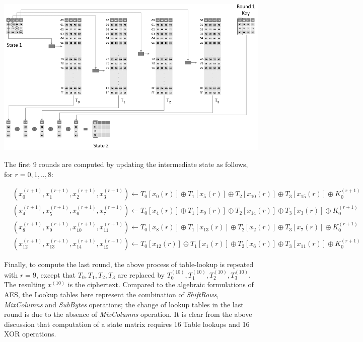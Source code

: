 \begin{center}
\includegraphics[scale=0.5,natwidth=916,natheight=528]{Figures/aes-1-1.png}
\label{fig: The diagram shows how $x_0^1,x_1^1,x_2^1,x_3^1$ are computed.}
\end{center}

\begin{flushleft}
The first 9 rounds are computed by updating the intermediate state as follows, for $r=0,1,..,8$:
\end{flushleft}
\begin{small}
\begin{align*}
&(x_0^{(r+1)},x_1^{(r+1)},x_2^{(r+1)},x_3^{(r+1)}) \gets T_0[x_0{(r)}] \oplus T_1[x_5{(r)}] \oplus T_2[x_{10}{(r)}] \oplus T_3[x_{15}{(r)}] \oplus K_0^{(r+1)}\\
&(x_4^{(r+1)},x_5^{(r+1)},x_6^{(r+1)},x_7^{(r+1)}) \gets T_0[x_4{(r)}] \oplus T_1[x_9{(r)}] \oplus T_2[x_{14}{(r)}] \oplus T_3[x_{3}{(r)}] \oplus K_0^{(r+1)}\\
&(x_8^{(r+1)},x_9^{(r+1)},x_{10}^{(r+1)},x_{11}^{(r+1)}) \gets T_0[x_8{(r)}] \oplus T_1[x_{13}{(r)}] \oplus T_2[x_{2}{(r)}] \oplus T_3[x_{7}{(r)}] \oplus K_0^{(r+1)}\\
&(x_{12}^{(r+1)},x_{13}^{(r+1)},x_{14}^{(r+1)},x_{15}^{(r+1)}) \gets T_0[x_{12}{(r)}] \oplus T_1[x_1{(r)}] \oplus T_2[x_{6}{(r)}] \oplus T_3[x_{11}{(r)}] \oplus K_0^{(r+1)}
\end{align*}
\end{small}

Finally, to compute the last round, the above process of table-lookup is repeated with $r=9$, except that $T_0,T_1,T_2,T_3$ are replaced by $T_0^{(10)},T_1^{(10)},T_2^{(10)},T_3^{(10)}$. The resulting $x^{(10)}$ is the ciphertext. Compared to the algebraic formulations of AES, the Lookup tables here represent the combination of \emph{ShiftRows}, \emph{MixColumns} and \emph{SubBytes} operations; the change of lookup tables in the last round is due to the absence of \emph{MixColumns} operation. It is clear from the above discussion that computation of a state matrix requires 16 Table lookups and 16 XOR operations.\\
